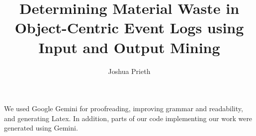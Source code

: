 \documentclass[bachelor, parskip=half, openany]{padsthesis}
\begin{document}
\author{Joshua Prieth}
\title{Determining Material Waste in Object-Centric Event Logs using Input and Output Mining}

\maketitle

\frontmatter

\tableofcontents
\listoffigures
\listoftables

\mainmatter


\iftrue{}\fi

\iftrue{}\fi

\iftrue{}\fi

\iftrue{}\fi

\iftrue{}\fi

\iftrue{}\fi

\iftrue{}\fi

\iftrue{}\fi

\backmatter
\printbibliography

We used Google Gemini for proofreading, improving grammar and readability, and generating Latex.
In addition, parts of our code implementing our work were generated using Gemini.
\end{document}
